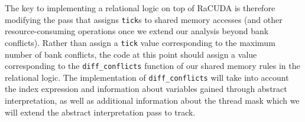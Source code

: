 The key to implementing a relational logic on top of RaCUDA is therefore
modifying the pass that assigns \texttt{tick}s to shared memory accesses
(and other resource-consuming operations once we extend our analysis beyond
bank conflicts).
%
Rather than assign a \texttt{tick} value corresponding to the maximum
number of bank conflicts, the code at this point should assign a value
corresponding to the \texttt{diff\_conflicts} function of our shared memory
rules in the relational logic.
%
The implementation of \texttt{diff\_conflicts} will take into account the
index expression and information about variables gained through abstract
interpretation, as well as additional information about the thread mask
which we will extend the abstract interpretation pass to track.
